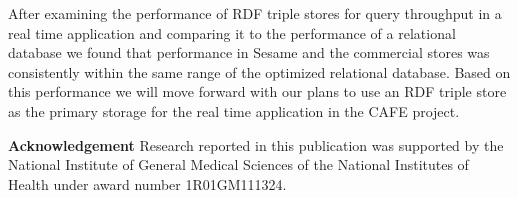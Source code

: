 \documentclass{llncs}
\begin{document}
After examining the performance of RDF triple stores for query throughput in a real time application and comparing it to the performance of a relational database we found that performance in Sesame and the commercial stores was consistently within the same range of the optimized relational database.
Based on this performance we will move forward with our plans to use an RDF triple store as the primary storage for the real time application in the CAFE project.

\medskip
\noindent
\textbf{Acknowledgement} Research reported in this publication was supported by the National Institute of General Medical Sciences of the National Institutes of Health under award number 1R01GM111324.



\end{document}
